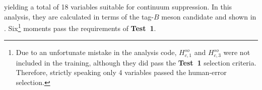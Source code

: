 yielding a total of 18 variables suitable for continuum suppression.
In this analysis, they are calculated in terms of the tag-$B$ meson candidate and shown in
.
Six\footnote[1]{Due to an unfortunate mistake in the analysis code, $H_{c,1}^{so}$ and $H_{c,3}^{so}$ were not included in the \BDT training, although they did pass the \textbf{Test~1} selection criteria.
Therefore, strictly speaking only 4 variables passed the human-error selection.
}
moments pass the requirements of \textbf{Test~1}.

